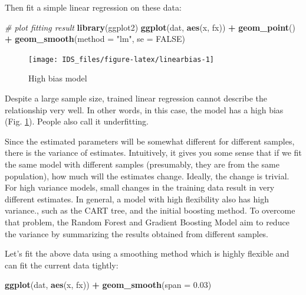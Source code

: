 \documentclass[12pt,]{krantz}
\makeatletter
\newenvironment{Shaded}{\begin{snugshade}}{\end{snugshade}}
\newcommand{\CommentTok}[1]{\textcolor[rgb]{0.37,0.37,0.37}{\textit{#1}}}
\newcommand{\DataTypeTok}[1]{\textcolor[rgb]{0.27,0.27,0.27}{#1}}
\newcommand{\FloatTok}[1]{\textcolor[rgb]{0.06,0.06,0.06}{#1}}
\newcommand{\KeywordTok}[1]{\textcolor[rgb]{0.27,0.27,0.27}{\textbf{#1}}}
\newcommand{\NormalTok}[1]{#1}
\newcommand{\OperatorTok}[1]{\textcolor[rgb]{0.43,0.43,0.43}{\textbf{#1}}}
\newcommand{\OtherTok}[1]{\textcolor[rgb]{0.37,0.37,0.37}{#1}}
\newcommand{\StringTok}[1]{\textcolor[rgb]{0.5,0.5,0.5}{#1}}
\newenvironment{kframe}{%
\medskip{}
\setlength{\fboxsep}{.8em}
 \def\at@end@of@kframe{}%
 \ifinner\ifhmode%
  \def\at@end@of@kframe{\end{minipage}}%
  \begin{minipage}{\columnwidth}%
 \fi\fi%
 \def\FrameCommand##1{\hskip\@totalleftmargin \hskip-\fboxsep
 \colorbox{shadecolor}{##1}\hskip-\fboxsep
     \hskip-\linewidth \hskip-\@totalleftmargin \hskip\columnwidth}%
 \MakeFramed {\advance\hsize-\width
   \@totalleftmargin\z@ \linewidth\hsize
   \@setminipage}}%
 {\par\unskip\endMakeFramed%
 \at@end@of@kframe}
\renewenvironment{Shaded}{\begin{kframe}}{\end{kframe}}
\makeatother
\begin{document}
Then fit a simple linear regression on these data:

\begin{Shaded}
\begin{Highlighting}[]
\CommentTok{# plot fitting result}
\KeywordTok{library}\NormalTok{(ggplot2)}
\KeywordTok{ggplot}\NormalTok{(dat, }\KeywordTok{aes}\NormalTok{(x, fx)) }\OperatorTok{+}\StringTok{ }\KeywordTok{geom_point}\NormalTok{() }\OperatorTok{+}\StringTok{ }\KeywordTok{geom_smooth}\NormalTok{(}\DataTypeTok{method =} \StringTok{"lm"}\NormalTok{, }\DataTypeTok{se =} \OtherTok{FALSE}\NormalTok{)}
\end{Highlighting}
\end{Shaded}

\begin{figure}

{\centering \texttt{[image: IDS\_files/figure-latex/linearbias-1]} 

}

\caption{High bias model}\label{fig:linearbias}
\end{figure}

Despite a large sample size, trained linear regression cannot describe the relationship very well. In other words, in this case, the model has a high bias (Fig. \ref{fig:linearbias}). People also call it underfitting.

Since the estimated parameters will be somewhat different for different samples, there is the variance of estimates. Intuitively, it gives you some sense that if we fit the same model with different samples (presumably, they are from the same population), how much will the estimates change. Ideally, the change is trivial. For high variance models, small changes in the training data result in very different estimates. In general, a model with high flexibility also has high variance., such as the CART tree, and the initial boosting method. To overcome that problem, the Random Forest and Gradient Boosting Model aim to reduce the variance by summarizing the results obtained from different samples.

Let's fit the above data using a smoothing method which is highly flexible and can fit the current data tightly:

\begin{Shaded}
\begin{Highlighting}[]
\KeywordTok{ggplot}\NormalTok{(dat, }\KeywordTok{aes}\NormalTok{(x, fx)) }\OperatorTok{+}\StringTok{ }\KeywordTok{geom_smooth}\NormalTok{(}\DataTypeTok{span =} \FloatTok{0.03}\NormalTok{)}
\end{Highlighting}
\end{Shaded}
\end{document}
